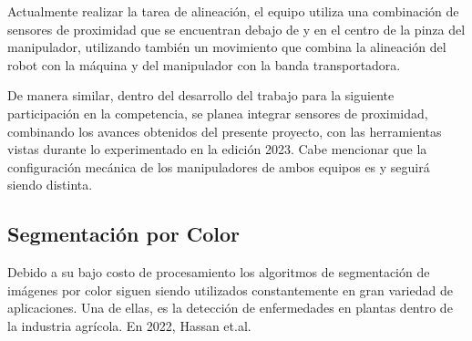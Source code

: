 Actualmente realizar la tarea de alineación, el equipo utiliza una combinación de sensores de proximidad que se encuentran debajo de y en el centro de la pinza del manipulador, utilizando también un movimiento que combina la alineación del robot con la máquina y del manipulador con la banda transportadora.

De manera similar, dentro del desarrollo del trabajo para la siguiente participación en la competencia, se planea integrar sensores de proximidad, combinando los avances obtenidos del presente proyecto, con las herramientas vistas durante lo experimentado en la edición 2023. Cabe mencionar que la configuración mecánica de los manipuladores de ambos equipos es y seguirá siendo distinta. 

\subsection{Segmentación por Color}
Debido a su bajo costo de procesamiento los algoritmos de segmentación de imágenes por color siguen siendo utilizados constantemente en gran variedad de aplicaciones. Una de ellas, es la detección de enfermedades en plantas dentro de la industria agrícola. En 2022, Hassan et.al. \cite{}


